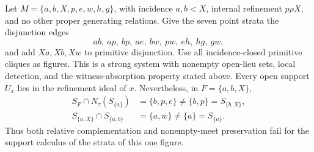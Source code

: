 \begin{proposition}\label{prop:eight-meet}
Let $M=\{a,b,X,p,e,w,h,g\}$, with incidence $a,b<X$, internal
refinement $p\rho X$, and no other proper generating relations.
Give the seven point strata the disjunction edges
\[
 ab,\ ap,\ bp,\ ae,\ bw,\ pw,\ eh,\ hg,\ gw,
\]
and add $Xa,Xb,Xw$ to primitive disjunction. Use all
incidence-closed primitive cliques as figures. This is a strong
system with nonempty open-lieu sets, local detection, and the
witness-absorption property stated above. Every open support
$U_x$ lies in the refinement ideal of $x$. Nevertheless, in
$F=\{a,b,X\}$,
\[
\begin{aligned}
 S_F\cap N_\tau(S_{\{a\}})&=\{b,p,e\}
       \ne\{b,p\}=S_{\{b,X\}},\\
 S_{\{a,X\}}\cap S_{\{a,b\}}&=\{a,w\}
       \ne\{a\}=S_{\{a\}}.
\end{aligned}
\]
Thus both relative complementation and nonempty-meet preservation
fail for the support calculus of the strata of this one figure.
\end{proposition}
